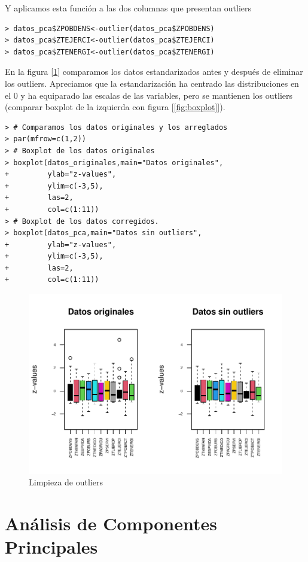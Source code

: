 \documentclass[12pt,twoside]{report}
\begin{document}
Y aplicamos esta función a las dos columnas que presentan outliers

\begin{lstlisting}
> datos_pca$ZPOBDENS<-outlier(datos_pca$ZPOBDENS)
> datos_pca$ZTEJERCI<-outlier(datos_pca$ZTEJERCI)
> datos_pca$ZTENERGI<-outlier(datos_pca$ZTENERGI)
\end{lstlisting}

En la figura [\ref{fig:boxplot_comparison}] comparamos los datos estandarizados antes y después de eliminar los outliers. Apreciamos que la estandarización ha centrado las distribuciones en el 0 y ha equiparado las escalas de las variables, pero se mantienen los outliers (comparar boxplot de la izquierda con figura [\ref{fig:boxplot}]). 

\begin{lstlisting}
> # Comparamos los datos originales y los arreglados 
> par(mfrow=c(1,2))
> # Boxplot de los datos originales
> boxplot(datos_originales,main="Datos originales",
+         ylab="z-values",
+         ylim=c(-3,5),
+         las=2,
+         col=c(1:11))
> # Boxplot de los datos corregidos.
> boxplot(datos_pca,main="Datos sin outliers",
+         ylab="z-values",
+         ylim=c(-3,5),
+         las=2,
+         col=c(1:11))
\end{lstlisting}

\begin{figure}[H]
\includegraphics[width=\textwidth]{../code/figures/boxplot_comparison.pdf}
\caption{Limpieza de outliers}
\label{fig:boxplot_comparison}
\end{figure} 

\chapter*{Análisis de Componentes Principales}
\end{document}
